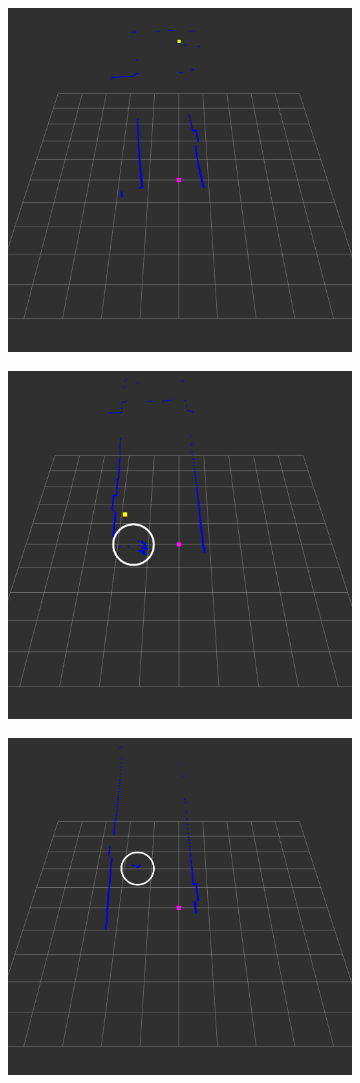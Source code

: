 \documentclass{article}
\begin{document}
\begin{figure}[t]
	\centering
	\begin{subfigure}{.5\textwidth}
		\centering
		\includegraphics[width=.65\linewidth, height=.65\linewidth]{ftd_false_negative_1}
		\caption{}
		\label{fig:drow_false_negative_1}
	\end{subfigure}%
	\begin{subfigure}{.5\textwidth}
		\centering
		\includegraphics[width=.65\linewidth, height=.65\linewidth]{ftd_false_negative_2}
		\caption{}
		\label{fig:drow_false_negative_2}
	\end{subfigure}
	\parbox[b]{\textwidth}{}
	\begin{subfigure}{.5\textwidth}
		\centering
		\includegraphics[width=.65\linewidth, height=.65\linewidth]{ftd_false_positive_1}

\end{subfigure}
\end{figure}
\end{document}
